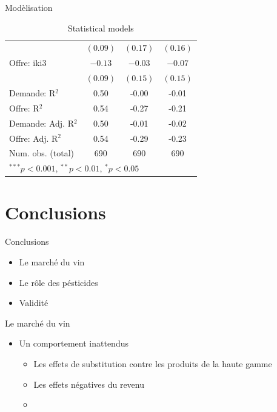\documentclass[11pt,ignorenonframetext,]{beamer}
\providecommand{\tightlist}{%
  \setlength{\itemsep}{0pt}\setlength{\parskip}{0pt}}
\begin{document}
\begin{frame}{Modèlisation}
\begin{table}[!htbp]
\begin{center}
\begin{tabular}{l c c c }
                    & $(0.09)$       & $(0.17)$       & $(0.16)$       \\
Offre: iki3         & $-0.13$        & $-0.03$        & $-0.07$        \\
                    & $(0.09)$       & $(0.15)$       & $(0.15)$       \\
\hline
Demande: R$^2$      & 0.50           & -0.00          & -0.01          \\
Offre: R$^2$        & 0.54           & -0.27          & -0.21          \\
Demande: Adj. R$^2$ & 0.50           & -0.01          & -0.02          \\
Offre: Adj. R$^2$   & 0.54           & -0.29          & -0.23          \\
Num. obs. (total)   & 690            & 690            & 690            \\
\hline
\multicolumn{4}{l}{\scriptsize{$^{***}p<0.001$, $^{**}p<0.01$, $^*p<0.05$}}
\end{tabular}
\caption{Statistical models}
\label{table : ols, 2sls et 3sls, full information clusters}
\end{center}
\end{table}

\normalsize

\end{frame}

\hypertarget{conclusions}{%
\section{Conclusions}\label{conclusions}}

\begin{frame}{Conclusions}
\protect\hypertarget{conclusions-1}{}

\begin{itemize}
\tightlist
\item
  Le marché du vin
\item
  Le rôle des pésticides\\
\item
  Validité
\end{itemize}

\end{frame}

\begin{frame}{Le marché du vin}
\protect\hypertarget{le-marche-du-vin}{}

\begin{itemize}
\tightlist
\item
  Un comportement inattendus

  \begin{itemize}
  \item
    Les effets de substitution contre les produits de la haute gamme
  \item
    Les effets négatives du revenu
  \item
  \end{itemize}
\end{itemize}

\end{frame}
\end{document}

